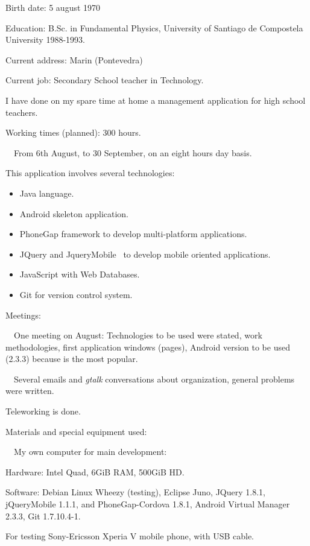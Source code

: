 \documentclass[a4paper]{article}
\begin{document}
Birth date: 5 august 1970

Education: B.Sc. in Fundamental Physics, University of Santiago de
Compostela University 1988-1993.

Current address: Marin (Pontevedra)

Current job: Secondary School teacher in Technology.

I have done on my spare time at home a management application for high
school teachers.

Working times (planned): 300 hours.

\ \ From 6th August, to 30 September, on an eight hours day basis.

This application involves several technologies:

\begin{itemize}
\item Java language.
\item Android skeleton application.
\item PhoneGap framework to develop multi-platform applications.
\item JQuery and JqueryMobile \ to develop mobile oriented applications.
\item JavaScript with Web Databases.
\item Git for version control system.
\end{itemize}
Meetings:

\ \ One meeting on August: Technologies to be used were stated, work
methodologies, first application windows (pages), Android version to be
used (2.3.3) because is the most popular. 

\ \ Several emails and \textit{gtalk} conversations about organization,
general problems were written.

Teleworking is done. 

Materials and special equipment used:

\ \ My own computer for main development: 

Hardware: Intel Quad, 6GiB RAM, 500GiB HD. 

Software: Debian Linux Wheezy (testing), Eclipse Juno, JQuery 1.8.1,
jQueryMobile 1.1.1, and PhoneGap-Cordova 1.8.1, Android Virtual Manager
2.3.3, Git 1.7.10.4-1.

For testing Sony-Ericsson Xperia V mobile phone, with USB cable.


\bigskip
\end{document}
